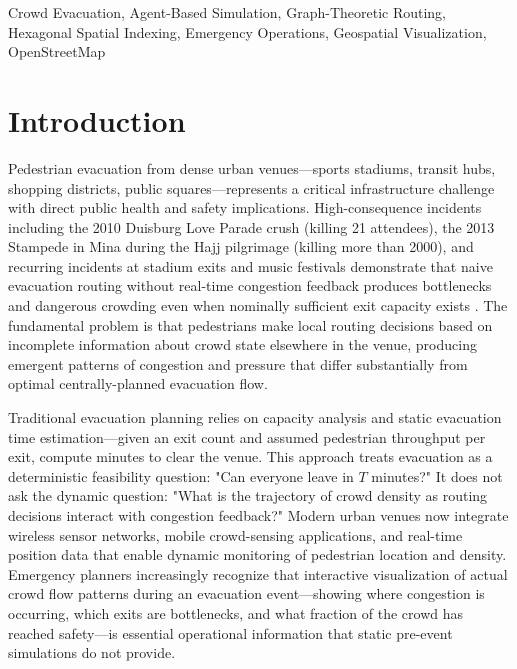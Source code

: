 \documentclass[conference]{IEEEtran}
\begin{document}
\begin{IEEEkeywords}
Crowd Evacuation, Agent-Based Simulation, Graph-Theoretic Routing, Hexagonal Spatial Indexing, Emergency Operations, Geospatial Visualization, OpenStreetMap
\end{IEEEkeywords}

\section{Introduction}

Pedestrian evacuation from dense urban venues—sports stadiums, transit hubs, shopping districts, public squares—represents a critical infrastructure challenge with direct public health and safety implications. High-consequence incidents including the 2010 Duisburg Love Parade crush (killing 21 attendees), the 2013 Stampede in Mina during the Hajj pilgrimage (killing more than 2000), and recurring incidents at stadium exits and music festivals demonstrate that naive evacuation routing without real-time congestion feedback produces bottlenecks and dangerous crowding even when nominally sufficient exit capacity exists \cite{helbing2000simulating}. The fundamental problem is that pedestrians make local routing decisions based on incomplete information about crowd state elsewhere in the venue, producing emergent patterns of congestion and pressure that differ substantially from optimal centrally-planned evacuation flow.

Traditional evacuation planning relies on capacity analysis and static evacuation time estimation—given an exit count and assumed pedestrian throughput per exit, compute minutes to clear the venue. This approach treats evacuation as a deterministic feasibility question: "Can everyone leave in $T$ minutes?" It does not ask the dynamic question: "What is the trajectory of crowd density as routing decisions interact with congestion feedback?" Modern urban venues now integrate wireless sensor networks, mobile crowd-sensing applications, and real-time position data that enable dynamic monitoring of pedestrian location and density. Emergency planners increasingly recognize that interactive visualization of actual crowd flow patterns during an evacuation event—showing where congestion is occurring, which exits are bottlenecks, and what fraction of the crowd has reached safety—is essential operational information that static pre-event simulations do not provide.
\end{document}
